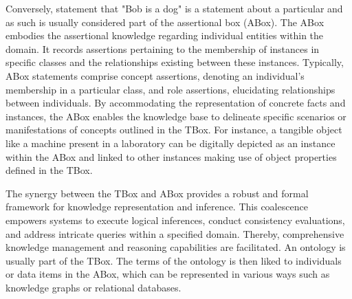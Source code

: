 Conversely, statement that "Bob is a dog" is a statement about a particular and as such is usually considered part of the assertional box (ABox). The ABox embodies the assertional knowledge regarding individual entities within the domain. It records assertions pertaining to the membership of instances in specific classes and the relationships existing between these instances. Typically, ABox statements comprise concept assertions, denoting an individual's membership in a particular class, and role assertions, elucidating relationships between individuals. By accommodating the representation of concrete facts and instances, the ABox enables the knowledge base to delineate specific scenarios or manifestations of concepts outlined in the TBox. For instance, a tangible object like a machine present in a laboratory can be digitally depicted as an instance within the ABox and linked to other instances making use of object properties defined in the TBox.

The synergy between the TBox and ABox provides a robust and formal framework for knowledge representation and inference. This coalescence empowers systems to execute logical inferences, conduct consistency evaluations, and address intricate queries within a specified domain. Thereby, comprehensive knowledge management and reasoning capabilities are facilitated. An ontology is usually part of the TBox. The terms of the ontology is then liked to individuals or data items in the ABox, which can be represented in various ways such as knowledge graphs or relational databases.
